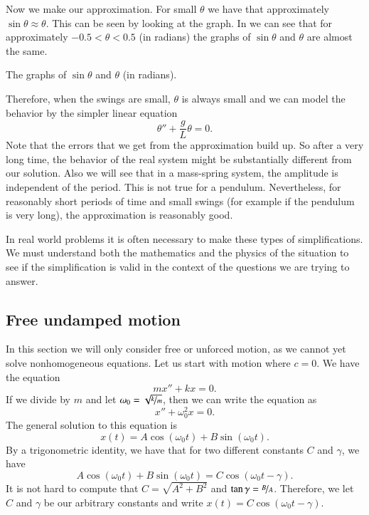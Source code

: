 Now we make our approximation.  For small $\theta$ we have that approximately
$\sin \theta \approx \theta$.  This can be seen by looking at the graph.
In  we can see that for approximately
$-0.5 < \theta < 0.5$ (in radians) the graphs of $\sin \theta$ and $\theta$ are almost the
same.

\begin{mywrapfig}{3.25in}
\capstart
{}
\caption{The graphs of $\sin \theta$ and $\theta$ (in radians).\label{mv:sinthetafig}}
\end{mywrapfig}

Therefore, when the swings are small, $\theta$ is always small and we can
model the behavior by the simpler linear equation
\begin{equation*}
\theta'' + \frac{g}{L} \theta = 0 .
\end{equation*}
Note that the errors that we get from the approximation build up.
So after a
very long time, the behavior of the real system might be substantially
different from our solution.  Also we will
see that in a mass-spring system, the amplitude is independent of the
period.
This is not true for a pendulum.  Nevertheless, for reasonably short periods of time
and small swings (for example if the pendulum is very long),
the approximation is reasonably good.

In real world problems it is often necessary to make these types of
simplifications.  We must understand both the mathematics and
the physics of the situation to see if the simplification is valid in the
context of the questions we are trying to answer.

\subsection{Free undamped motion}

In this section we will only consider free or unforced motion,
as we cannot yet solve nonhomogeneous equations.  Let us start with
 motion where $c=0$.  We have the equation
\begin{equation*}
mx'' + kx = 0 .
\end{equation*}
If we divide by $m$ and let $\omega_0 = \sqrt{\nicefrac{k}{m}}$, then we can write the equation as
\begin{equation*}
x'' + \omega_0^2 x = 0 .
\end{equation*}
The general solution to this equation is
\begin{equation*}
x(t) = A \cos (\omega_0 t) + B \sin (\omega_0 t) .
\end{equation*}
By a trigonometric identity, we have that for two 
different
constants $C$ and $\gamma$, we have
\begin{equation*}
A \cos (\omega_0 t) + B \sin (\omega_0 t) =
C \cos ( \omega_0 t - \gamma ) .
\end{equation*}
It is not hard to compute that $C= \sqrt{A^2 + B^2}$ and $\tan \gamma =
\nicefrac{B}{A}$.  Therefore, we let
$C$ and $\gamma$ be our arbitrary constants and write
$x(t) = C \cos ( \omega_0 t - \gamma )$.

